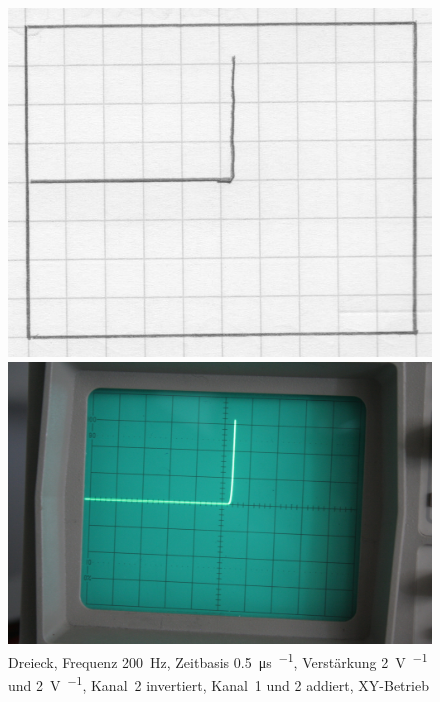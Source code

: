 \begin{figure}[htbp]
	\centering
	\begin{minipage}{.45\linewidth}
	\includegraphics[width=\linewidth]{Oszi_Hand/786.jpg}
	\end{minipage}
	\hfill
	\begin{minipage}{.45\linewidth}
	\includegraphics[width=\linewidth]{Oszi_Foto/786.jpg}
	\end{minipage}
	\caption{%
		Dreieck, Frequenz \SI{200}{\hertz},
		Zeitbasis \SI{.5}{\micro\second\per\division},
		Verstärkung \SI{2}{\volt\per\division} und \SI{2}{\volt\per\division},
		Kanal~2 invertiert, Kanal~1 und 2 addiert, XY-Betrieb
	}
	\label{fig:786}
\end{figure}

